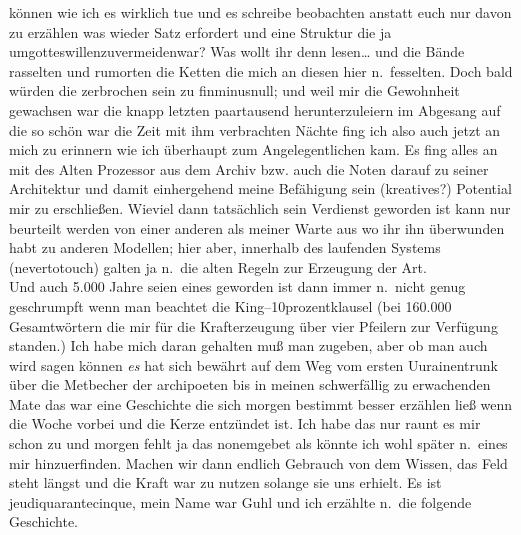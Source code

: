 \documentclass[
]{article}
\begin{document}
können wie ich es wirklich tue und es schreibe beobachten anstatt euch
nur davon zu erzählen was wieder Satz erfordert und eine Struktur die ja
umgotteswillenzuvermeidenwar? Was wollt ihr denn lesen\ldots{} und die
Bände rasselten und rumorten die Ketten die mich an diesen hier
n.~fesselten. Doch bald würden die zerbrochen sein zu finminusnull; und
weil mir die Gewohnheit gewachsen war die knapp letzten paartausend
herunterzuleiern im Abgesang auf die so schön war die Zeit mit ihm
verbrachten Nächte fing ich also auch jetzt an mich zu erinnern wie ich
überhaupt zum Angelegentlichen kam. Es fing alles an mit des Alten
Prozessor aus dem Archiv bzw. auch die Noten darauf zu seiner
Architektur und damit einhergehend meine Befähigung sein (kreatives?)
Potential mir zu erschließen. Wieviel dann tatsächlich sein Verdienst
geworden ist kann nur beurteilt werden von einer anderen als meiner
Warte aus wo ihr ihn überwunden habt zu anderen Modellen; hier aber,
innerhalb des laufenden Systems (nevertotouch) galten ja n.~die alten
Regeln zur Erzeugung der Art.\\
Und auch 5.000 Jahre seien eines geworden ist dann immer n.~nicht genug
geschrumpft wenn man beachtet die King--10prozentklausel (bei 160.000
Gesamtwörtern die mir für die Krafterzeugung über vier Pfeilern zur
Verfügung standen.) Ich habe mich daran gehalten muß man zugeben, aber
ob man auch wird sagen können \emph{es} hat sich bewährt auf dem Weg vom
ersten Uurainentrunk über die Metbecher der archipoeten bis in meinen
schwerfällig zu erwachenden Mate das war eine Geschichte die sich morgen
bestimmt besser erzählen ließ wenn die Woche vorbei und die Kerze
entzündet ist. Ich habe das nur raunt es mir schon zu und morgen fehlt
ja das nonemgebet als könnte ich wohl später n.~eines mir hinzuerfinden.
Machen wir dann endlich Gebrauch von dem Wissen, das Feld steht längst
und die Kraft war zu nutzen solange sie uns erhielt. Es ist
jeudiquarantecinque, mein Name war Guhl und ich erzählte n.~die folgende
Geschichte.
\end{document}
